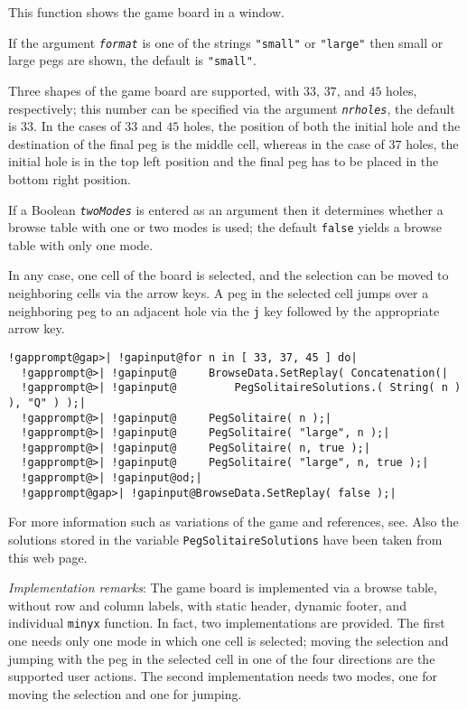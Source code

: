 \documentclass[a4paper,11pt]{report}
\begin{document}
{{{ This function shows the game board in a window. 

 If the argument \mbox{\texttt{\mdseries\slshape format}} is one of the strings \texttt{"small"} or \texttt{"large"} then small or large pegs are shown, the default is \texttt{"small"}. 

 Three shapes of the game board are supported, with $33$, $37$, and $45$ holes, respectively; this number can be specified via the argument \mbox{\texttt{\mdseries\slshape nrholes}}, the default is $33$. In the cases of $33$ and $45$ holes, the position of both the initial hole and the destination of the final
peg is the middle cell, whereas in the case of $37$ holes, the initial hole is in the top left position and the final peg has to
be placed in the bottom right position. 

 If a Boolean \mbox{\texttt{\mdseries\slshape twoModes}} is entered as an argument then it determines whether a browse table with one
or two modes is used; the default \texttt{false} yields a browse table with only one mode. 

 In any case, one cell of the board is selected, and the selection can be moved
to neighboring cells via the arrow keys. A peg in the selected cell jumps over
a neighboring peg to an adjacent hole via the \texttt{j} key followed by the appropriate arrow key. 

 
\begin{Verbatim}[commandchars=!@|,fontsize=\small,frame=single,label=Example]
  !gapprompt@gap>| !gapinput@for n in [ 33, 37, 45 ] do|
  !gapprompt@>| !gapinput@     BrowseData.SetReplay( Concatenation(|
  !gapprompt@>| !gapinput@         PegSolitaireSolutions.( String( n ) ), "Q" ) );|
  !gapprompt@>| !gapinput@     PegSolitaire( n );|
  !gapprompt@>| !gapinput@     PegSolitaire( "large", n );|
  !gapprompt@>| !gapinput@     PegSolitaire( n, true );|
  !gapprompt@>| !gapinput@     PegSolitaire( "large", n, true );|
  !gapprompt@>| !gapinput@od;|
  !gapprompt@gap>| !gapinput@BrowseData.SetReplay( false );|
\end{Verbatim}
 

 For more information such as variations of the game and references,
see{\nobreakspace}\cite{PegSolitaireWeb}. Also the solutions stored in the variable \texttt{PegSolitaireSolutions} have been taken from this web page. 

 \emph{Implementation remarks}: The game board is implemented via a browse table, without row and column
labels, with static header, dynamic footer, and individual \texttt{minyx} function. In fact, two implementations are provided. The first one needs only
one mode in which one cell is selected; moving the selection and jumping with
the peg in the selected cell in one of the four directions are the supported
user actions. The second implementation needs two modes, one for moving the
selection and one for jumping. 

}}}
\end{document}
